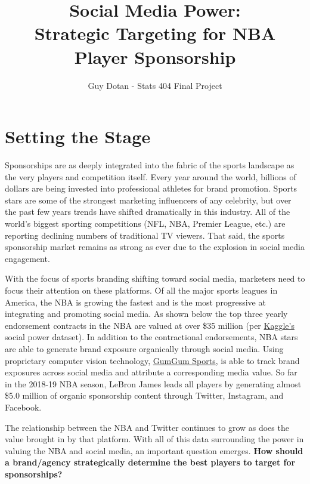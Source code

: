 \documentclass[11pt]{article}
\title{Social Media Power: \\
    	    Strategic Targeting for NBA Player Sponsorship}
\author{Guy Dotan - Stats 404 Final Project}
\begin{document}
    
    
    \maketitle
    


    \section{Setting the Stage}\label{setting-the-stage}

Sponsorships are as deeply integrated into the fabric of the sports
landscape as the very players and competition itself. Every year around
the world, billions of dollars are being invested into professional
athletes for brand promotion. Sports stars are some of the strongest
marketing influencers of any celebrity, but over the past few years
trends have shifted dramatically in this industry. All of the world's
biggest sporting competitions (NFL, NBA, Premier League, etc.) are
reporting declining numbers of traditional TV viewers. That said, the
sports sponsorship market remains as strong as ever due to the explosion
in social media engagement.

With the focus of sports branding shifting toward social media,
marketers need to focus their attention on these platforms. Of all the
major sports leagues in America, the NBA is growing the fastest and is
the most progressive at integrating and promoting social media. As shown
below the top three yearly endorsement contracts in the NBA are valued
at over \$35 million (per
\href{https://kaggle.com/noahgift/social-power-nba}{Kaggle's} social
power dataset). In addition to the contractional endorsements, NBA
stars are able to generate brand exposure organically through social
media. Using proprietary computer vision technology,
\href{https://www.gumgum.com/sports}{GumGum Sports}, is able to track
brand exposures across social media and attribute a corresponding media
value. So far in the 2018-19 NBA season, LeBron James leads all players
by generating almost \$5.0 million of organic sponsorship content
through Twitter, Instagram, and Facebook.

\begin{figure}[h]
\centering
 \label{}
\caption{}
\end{figure}

The relationship between the NBA and Twitter continues to grow as does
the value brought in by that platform. With all of this data surrounding
the power in valuing the NBA and social media, an important question
emerges. \textbf{How should a brand/agency strategically determine the best
players to target for sponsorships?}
\end{document}
